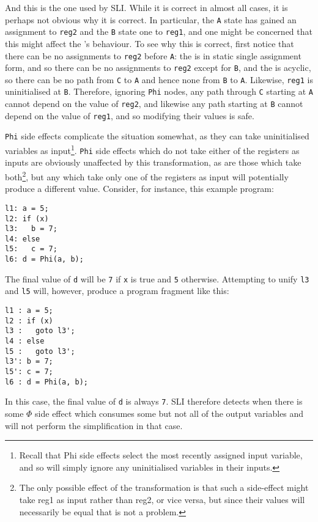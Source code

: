 And this is the one used by SLI.  While it is correct in almost all
cases, it is perhaps not obvious why it is correct.  In particular,
the \verb|A| state has gained an assignment to \verb|reg2| and the
\verb|B| state one to \verb|reg1|, and one might be concerned that
this might affect the \StateMachine's behaviour.  To see why this is
correct, first notice that there can be no assignments to \verb|reg2|
before \verb|A|: the {\StateMachine} is in static single assignment
form, and so there can be no assignments to \verb|reg2| except for
\verb|B|, and the {\StateMachine} is acyclic, so there can be no path
from \verb|C| to \verb|A| and hence none from \verb|B| to \verb|A|.
Likewise, \verb|reg1| is uninitialised at \verb|B|.  Therefore,
ignoring \verb|Phi| nodes, any path through \verb|C| starting at
\verb|A| cannot depend on the value of \verb|reg2|, and likewise any
path starting at \verb|B| cannot depend on the value of \verb|reg1|,
and so modifying their values is safe.

\verb|Phi| side effects complicate the situation somewhat, as they can
take uninitialised variables as input\footnote{Recall that Phi side
  effects select the most recently assigned input variable, and so
  will simply ignore any uninitialised variables in their inputs.}.
\verb|Phi| side effects which do not take either of the registers as
inputs are obviously unaffected by this transformation, as are those
which take both\footnote{The only possible effect of the
  transformation is that such a side-effect might take reg1 as input
  rather than reg2, or vice versa, but since their values will
  necessarily be equal that is not a problem.}, but any which take
only one of the registers as input will potentially produce a
different value.  Consider, for instance, this example program:

\begin{verbatim}
l1: a = 5;
l2: if (x)
l3:   b = 7;
l4: else
l5:   c = 7;
l6: d = Phi(a, b);
\end{verbatim}

The final value of \verb|d| will be \verb|7| if \verb|x| is true and
\verb|5| otherwise.  Attempting to unify \verb|l3| and \verb|l5| will,
however, produce a program fragment like this:

\begin{verbatim}
l1 : a = 5;
l2 : if (x)
l3 :   goto l3';
l4 : else
l5 :   goto l3';
l3': b = 7;
l5': c = 7;
l6 : d = Phi(a, b);
\end{verbatim}

In this case, the final value of \verb|d| is always \verb|7|.  SLI
therefore detects when there is some $\Phi$ side effect which consumes
some but not all of the output variables and will not perform the
simplification in that case.

